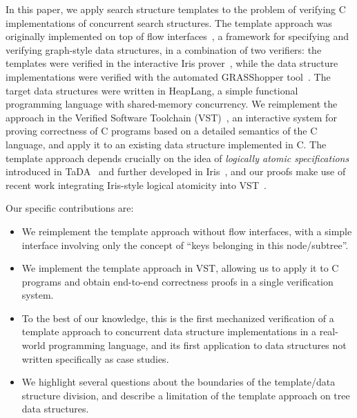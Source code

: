\documentclass[a4paper,UKenglish,cleveref, autoref, thm-restate]{lipics-v2021}
\begin{document}

In this paper, we apply search structure templates to the problem of verifying C implementations of concurrent search structures. The template approach was originally implemented on top of flow interfaces~\cite{krishna2017flow}, a framework for specifying and verifying graph-style data structures, in a combination of two verifiers: the templates were verified in the interactive Iris prover~\cite{iris}, while the data structure implementations were verified with the automated GRASShopper tool~\cite{grasshopper}. The target data structures were written in HeapLang, a simple functional programming language with shared-memory concurrency. We reimplement the approach in the Verified Software Toolchain (VST)~\cite{plcc}, an interactive system for proving correctness of C programs based on a detailed semantics of the C language, and apply it to an existing data structure implemented in C. The template approach depends crucially on the idea of \emph{logically atomic specifications} introduced in TaDA~\cite{tada} and further developed in Iris~\cite{iris}, and our proofs make use of recent work integrating Iris-style logical atomicity into VST~\cite{iris-vst-arxiv}. %

Our specific contributions are:
\begin{itemize}
\item We reimplement the template approach without flow interfaces, with a simple interface involving only the concept of ``keys belonging in this node/subtree''.
\item We implement the template approach in VST, allowing us to apply it to C programs and obtain end-to-end correctness proofs in a single verification system.
\item To the best of our knowledge, this is the first mechanized verification of a template approach to concurrent data structure implementations in a real-world programming language, and its first application to data structures not written specifically as case studies.
\item We highlight several questions about the boundaries of the template/data structure division, and describe a limitation of the template approach on tree data structures.
\end{itemize}
\end{document}
